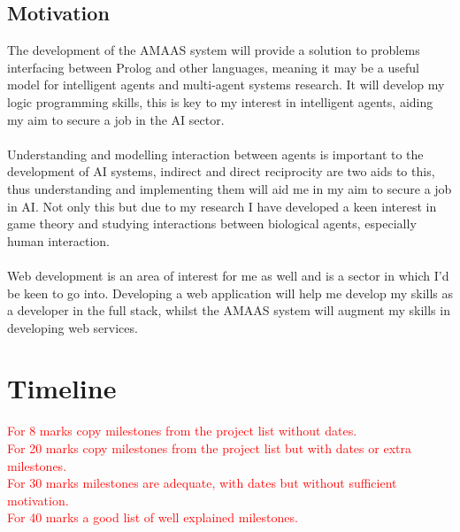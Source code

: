 \documentclass{article}
\begin{document}
\subsection*{Motivation}
The development of the AMAAS system will provide a solution to problems interfacing between Prolog and other languages, meaning it may be a useful model for intelligent agents and multi-agent systems research. It will develop my logic programming skills, this is key to my interest in intelligent agents, aiding my aim to secure a job in the AI sector.\\\\
Understanding and modelling interaction between agents is important to the development of AI systems, indirect and direct reciprocity are two aids to this, thus understanding and implementing them will aid me in my aim to secure a job in AI. Not only this but due to my research I have developed a keen interest in game theory and studying interactions between biological agents, especially human interaction.\\\\
Web development is an area of interest for me as well and is a sector in which I'd be keen to go into. Developing a web application will help me develop my skills as a developer in the full stack, whilst the AMAAS system will augment my skills in developing web services.

\section*{Timeline}

\textcolor{red}{For 8 marks copy milestones from the project list without dates.\\For 20 marks copy milestones from the project list but with dates or extra milestones.\\For 30 marks milestones are adequate, with dates but without sufficient motivation.\\For 40 marks a good list of well explained milestones.}
\end{document}
